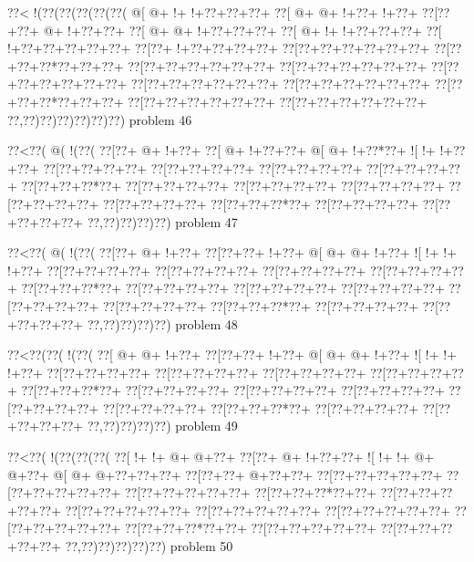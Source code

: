\vbox{\vbox{\goo
\0??<\- !(\0??(\0??(\0??(\0??(\0??(
\- @[\- @+\- !+\- !+\0??+\0??+\0??+
\0??[\- @+\- @+\- !+\0??+\- !+\0??+
\0??[\0??+\0??+\- @+\- !+\0??+\0??+
\0??[\- @+\- @+\- !+\0??+\0??+\0??+
\0??[\- @+\- !+\- !+\0??+\0??+\0??+
\0??[\- !+\0??+\0??+\0??+\0??+\0??+
\0??[\0??+\- !+\0??+\0??+\0??+\0??+
\0??[\0??+\0??+\0??+\0??+\0??+\0??+
\0??[\0??+\0??+\0??*\0??+\0??+\0??+
\0??[\0??+\0??+\0??+\0??+\0??+\0??+
\0??[\0??+\0??+\0??+\0??+\0??+\0??+
\0??[\0??+\0??+\0??+\0??+\0??+\0??+
\0??[\0??+\0??+\0??+\0??+\0??+\0??+
\0??[\0??+\0??+\0??+\0??+\0??+\0??+
\0??[\0??+\0??+\0??*\0??+\0??+\0??+
\0??[\0??+\0??+\0??+\0??+\0??+\0??+
\0??[\0??+\0??+\0??+\0??+\0??+\0??+
\0??,\0??)\0??)\0??)\0??)\0??)\0??)
}
\hfil problem 46\hfil\break
}

\vbox{\vbox{\goo
\0??<\0??(\- @(\- !(\0??(
\0??[\0??+\- @+\- !+\0??+
\0??[\- @+\- !+\0??+\0??+
\- @[\- @+\- !+\0??*\0??+
\- ![\- !+\- !+\0??+\0??+
\0??[\0??+\0??+\0??+\0??+
\0??[\0??+\0??+\0??+\0??+
\0??[\0??+\0??+\0??+\0??+
\0??[\0??+\0??+\0??+\0??+
\0??[\0??+\0??+\0??*\0??+
\0??[\0??+\0??+\0??+\0??+
\0??[\0??+\0??+\0??+\0??+
\0??[\0??+\0??+\0??+\0??+
\0??[\0??+\0??+\0??+\0??+
\0??[\0??+\0??+\0??+\0??+
\0??[\0??+\0??+\0??*\0??+
\0??[\0??+\0??+\0??+\0??+
\0??[\0??+\0??+\0??+\0??+
\0??,\0??)\0??)\0??)\0??)
}
\hfil problem 47\hfil\break
}

\vbox{\vbox{\goo
\0??<\0??(\- @(\- !(\0??(
\0??[\0??+\- @+\- !+\0??+
\0??[\0??+\0??+\- !+\0??+
\- @[\- @+\- @+\- !+\0??+
\- ![\- !+\- !+\- !+\0??+
\0??[\0??+\0??+\0??+\0??+
\0??[\0??+\0??+\0??+\0??+
\0??[\0??+\0??+\0??+\0??+
\0??[\0??+\0??+\0??+\0??+
\0??[\0??+\0??+\0??*\0??+
\0??[\0??+\0??+\0??+\0??+
\0??[\0??+\0??+\0??+\0??+
\0??[\0??+\0??+\0??+\0??+
\0??[\0??+\0??+\0??+\0??+
\0??[\0??+\0??+\0??+\0??+
\0??[\0??+\0??+\0??*\0??+
\0??[\0??+\0??+\0??+\0??+
\0??[\0??+\0??+\0??+\0??+
\0??,\0??)\0??)\0??)\0??)
}
\hfil problem 48\hfil\break
}

\vbox{\vbox{\goo
\0??<\0??(\0??(\- !(\0??(
\0??[\- @+\- @+\- !+\0??+
\0??[\0??+\0??+\- !+\0??+
\- @[\- @+\- @+\- !+\0??+
\- ![\- !+\- !+\- !+\0??+
\0??[\0??+\0??+\0??+\0??+
\0??[\0??+\0??+\0??+\0??+
\0??[\0??+\0??+\0??+\0??+
\0??[\0??+\0??+\0??+\0??+
\0??[\0??+\0??+\0??*\0??+
\0??[\0??+\0??+\0??+\0??+
\0??[\0??+\0??+\0??+\0??+
\0??[\0??+\0??+\0??+\0??+
\0??[\0??+\0??+\0??+\0??+
\0??[\0??+\0??+\0??+\0??+
\0??[\0??+\0??+\0??*\0??+
\0??[\0??+\0??+\0??+\0??+
\0??[\0??+\0??+\0??+\0??+
\0??,\0??)\0??)\0??)\0??)
}
\hfil problem 49\hfil\break
}

\vbox{\vbox{\goo
\0??<\0??(\- !(\0??(\0??(\0??(
\0??[\- !+\- !+\- @+\- @+\0??+
\0??[\0??+\- @+\- !+\0??+\0??+
\- ![\- !+\- !+\- @+\- @+\0??+
\- @[\- @+\- @+\0??+\0??+\0??+
\0??[\0??+\0??+\- @+\0??+\0??+
\0??[\0??+\0??+\0??+\0??+\0??+
\0??[\0??+\0??+\0??+\0??+\0??+
\0??[\0??+\0??+\0??+\0??+\0??+
\0??[\0??+\0??+\0??*\0??+\0??+
\0??[\0??+\0??+\0??+\0??+\0??+
\0??[\0??+\0??+\0??+\0??+\0??+
\0??[\0??+\0??+\0??+\0??+\0??+
\0??[\0??+\0??+\0??+\0??+\0??+
\0??[\0??+\0??+\0??+\0??+\0??+
\0??[\0??+\0??+\0??*\0??+\0??+
\0??[\0??+\0??+\0??+\0??+\0??+
\0??[\0??+\0??+\0??+\0??+\0??+
\0??,\0??)\0??)\0??)\0??)\0??)
}
\hfil problem 50\hfil\break
}

